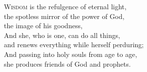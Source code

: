 
\lettrine{W}{isdom} is the refulgence of eternal light,\\
the spotless mirror of the power of God,\\
the image of his goodness,\\
And she, who is one, can do all things,\\
and renews everything while herself perduring;\\
And passing into holy souls from age to age,\\
she produces friends of God and prophets.
